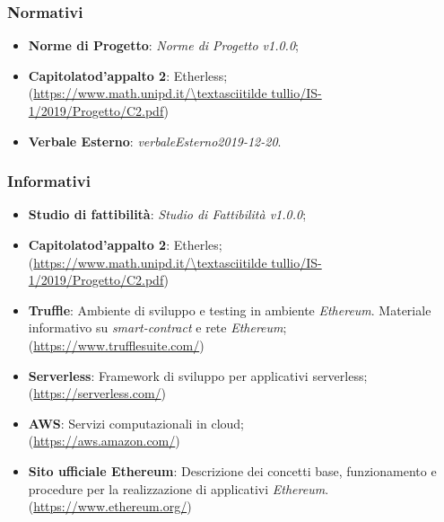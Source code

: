 \subsubsection{Normativi}
	\begin{itemize}
		\item \textbf{Norme di Progetto}: \textit{Norme di Progetto v1.0.0};
		\item \textbf{Capitolato\glo d'appalto 2}: Etherless;\\ 
			(\url{https://www.math.unipd.it/\textasciitilde tullio/IS-1/2019/Progetto/C2.pdf})
		\item \textbf{Verbale Esterno}: \textit{verbaleEsterno2019-12-20}.
	\end{itemize}
\subsubsection{Informativi}
\begin{itemize}
	\item \textbf{Studio di fattibilità}: \textit{Studio di Fattibilità v1.0.0};
    \item \textbf{Capitolato\glo d'appalto 2}: Etherles;\\ 
			(\url{https://www.math.unipd.it/\textasciitilde tullio/IS-1/2019/Progetto/C2.pdf})
	\item \textbf{Truffle}:  Ambiente di sviluppo e testing in ambiente \textit{Ethereum\glos}. Materiale informativo su \textit{smart-contract\glo} e rete \textit{Ethereum\glos};
		\\ (\url{https://www.trufflesuite.com/})
	\item \textbf{Serverless}:  Framework di sviluppo per applicativi serverless;\\ (\url{https://serverless.com/})
	\item \textbf{AWS}: Servizi computazionali in cloud; \\ (\url{https://aws.amazon.com/})
	\item \textbf{Sito ufficiale Ethereum\glo}: Descrizione dei concetti base, funzionamento e procedure per la realizzazione di applicativi \textit{Ethereum\glos}.
\\ (\url {https://www.ethereum.org/})
\end{itemize}

	
	
	
